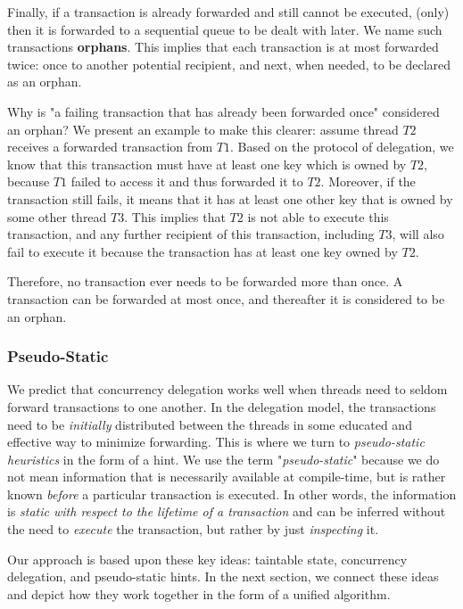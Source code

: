 Finally, if a transaction is already forwarded and still cannot be executed, (only) then it is
forwarded to a sequential queue to be dealt with later. We name such transactions \textbf{orphans}.
This implies that each transaction is at most forwarded twice: once to another potential recipient,
and next, when needed, to be declared as an orphan.


Why is "a failing transaction that has already been forwarded once" considered an orphan? We present
an example to make this clearer: assume thread $T2$ receives a forwarded transaction from $T1$.
Based on the protocol of delegation, we know that this transaction must have at least one key which
is owned by $T2$, because $T1$ failed to access it and thus forwarded it to $T2$. Moreover, if the
transaction still fails, it means that it has at least one other key that is owned by some other
thread $T3$. This implies that $T2$ is not able to execute this transaction, and any further
recipient of this transaction, including $T3$, will also fail to execute it because the transaction
has at least one key owned by $T2$.

Therefore, no transaction ever needs to be forwarded more than once. A transaction can be forwarded
at most once, and thereafter it is considered to be an orphan.

\subsubsection{Pseudo-Static}

We predict that concurrency delegation works well when threads need to seldom forward transactions
to one another. In the delegation model, the transactions need to be \textit{initially} distributed
between the threads in some educated and effective way to minimize forwarding. This is where we turn
to \textit{pseudo-static heuristics} in the form of a hint. We use the term "\textit{pseudo-static}"
because we do not mean information that is necessarily available at compile-time, but is rather
known \textit{before} a particular transaction is executed. In other words, the information is
\textit{static with respect to the lifetime of a transaction} and can be inferred without the need
to \textit{execute} the transaction, but rather by just \textit{inspecting} it.

Our approach is based upon these key ideas: taintable state, concurrency delegation, and
pseudo-static hints. In the next section, we connect these ideas and depict how they work together
in the form of a unified algorithm.

